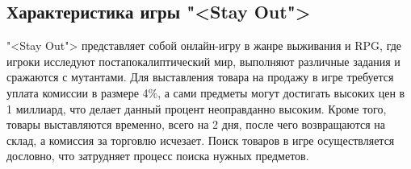 \subsection{Характеристика игры "<Stay Out">}

"<Stay Out"> представляет собой онлайн-игру в жанре выживания и RPG, где игроки исследуют постапокалиптический мир, выполняют различные задания и сражаются с мутантами. Для выставления товара на продажу в игре требуется уплата комиссии в размере 4\%, а сами предметы могут достигать высоких цен в 1 миллиард, что делает данный процент неоправданно высоким. Кроме того, товары выставляются временно, всего на 2 дня, после чего возвращаются на склад, а комиссия за торговлю исчезает. Поиск товаров в игре осуществляется дословно, что затрудняет процесс поиска нужных предметов.
